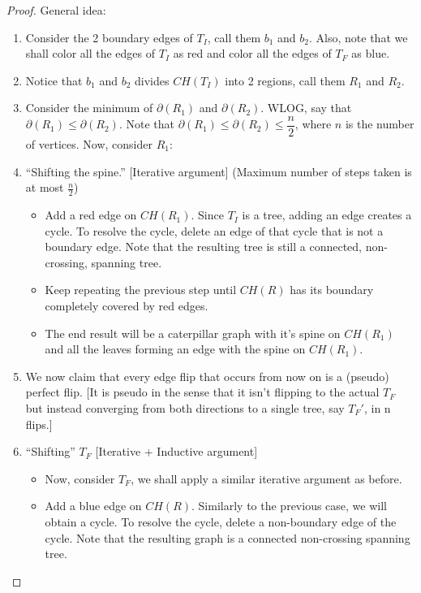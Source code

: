 \documentclass{article}
\begin{document}
\begin{proof}
	General idea:

	\begin{enumerate}
		\item Consider the 2 boundary edges of $T_I$, call them $b_1$ and $b_2$. Also, note that we shall color all the edges of $T_I$ as red and color all the edges of $T_F$ as blue.
		\item Notice that $b_1$ and $b_2$ divides $CH(T_I)$ into 2 regions, call them $R_1$ and $R_2$.
		\item Consider the minimum of $\partial(R_1)$ and $\partial(R_2)$. WLOG, say that $\partial(R_1) \leq \partial(R_2)$. Note that $\partial(R_1) \leq \partial(R_2) \leq \dfrac{n}{2}$, where $n$ is the number of vertices. Now, consider $R_1$:


		\item ``Shifting the spine.'' [Iterative argument] (Maximum number of steps taken is at most $\frac{n}{2}$)
		      \begin{itemize}
			      \item Add a red edge on $CH(R_1)$. Since $T_I$ is a tree, adding an edge creates a cycle. To resolve the cycle, delete an edge of that cycle that is not a boundary edge. Note that the resulting tree is still a connected, non-crossing, spanning tree.

			      \item Keep repeating the previous step until $CH(R)$ has its boundary completely covered by red edges.

			      \item The end result will be a caterpillar graph with it's spine on $CH(R_1)$ and all the leaves forming an edge with the spine on $CH(R_1)$.
		      \end{itemize}

		\item We now claim that every edge flip that occurs from now on is a (pseudo) perfect flip. [It is pseudo in the sense that it isn't flipping to the actual $T_F$ but instead converging from both directions to a single tree, say $T_F'$, in n flips.]

		\item ``Shifting'' $T_F$ [Iterative + Inductive argument]
		      \begin{itemize}
			      \item Now, consider $T_F$, we shall apply a similar iterative argument as before.

			      \item Add a blue edge on $CH(R)$. Similarly to the previous case, we will obtain a cycle. To resolve the cycle, delete a non-boundary edge of the cycle. Note that the resulting graph is a connected non-crossing spanning tree.


\end{itemize}
\end{enumerate}
\end{proof}
\end{document}
